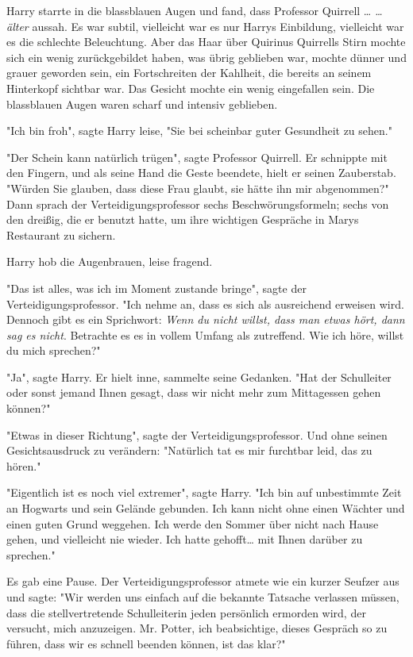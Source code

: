 {Harry starrte in die blassblauen Augen und fand, dass Professor Quirrell … \emph{… älter} aussah. Es war subtil, vielleicht war es nur Harrys Einbildung, vielleicht war es die schlechte Beleuchtung. Aber das Haar über Quirinus Quirrells Stirn mochte sich ein wenig zurückgebildet haben, was übrig geblieben war, mochte dünner und grauer geworden sein, ein Fortschreiten der Kahlheit, die bereits an seinem Hinterkopf sichtbar war. Das Gesicht mochte ein wenig eingefallen sein. Die blassblauen Augen waren scharf und intensiv geblieben.

"Ich bin froh", sagte Harry leise, "Sie bei scheinbar guter Gesundheit zu sehen."

"Der Schein kann natürlich trügen", sagte Professor Quirrell. Er schnippte mit den Fingern, und als seine Hand die Geste beendete, hielt er seinen Zauberstab. "Würden Sie glauben, dass diese Frau glaubt, sie hätte ihn mir abgenommen?" Dann sprach der Verteidigungsprofessor sechs Beschwörungsformeln; sechs von den dreißig, die er benutzt hatte, um ihre wichtigen Gespräche in Marys Restaurant zu sichern.

Harry hob die Augenbrauen, leise fragend.

"Das ist alles, was ich im Moment zustande bringe", sagte der Verteidigungsprofessor. "Ich nehme an, dass es sich als ausreichend erweisen wird. Dennoch gibt es ein Sprichwort: \emph{Wenn du nicht willst, dass man etwas hört, dann sag es nicht}. Betrachte es es in vollem Umfang als zutreffend. Wie ich höre, willst du mich sprechen?"

"Ja", sagte Harry. Er hielt inne, sammelte seine Gedanken. "Hat der Schulleiter oder sonst jemand Ihnen gesagt, dass wir nicht mehr zum Mittagessen gehen können?"

"Etwas in dieser Richtung", sagte der Verteidigungsprofessor. Und ohne seinen Gesichtsausdruck zu verändern: "Natürlich tat es mir furchtbar leid, das zu hören."

"Eigentlich ist es noch viel extremer", sagte Harry. "Ich bin auf unbestimmte Zeit an Hogwarts und sein Gelände gebunden. Ich kann nicht ohne einen Wächter und einen guten Grund weggehen. Ich werde den Sommer über nicht nach Hause gehen, und vielleicht nie wieder. Ich hatte gehofft… mit Ihnen darüber zu sprechen."

Es gab eine Pause. Der Verteidigungsprofessor atmete wie ein kurzer Seufzer aus und sagte: "Wir werden uns einfach auf die bekannte Tatsache verlassen müssen, dass die stellvertretende Schulleiterin jeden persönlich ermorden wird, der versucht, mich anzuzeigen. Mr. Potter, ich beabsichtige, dieses Gespräch so zu führen, dass wir es schnell beenden können, ist das klar?"

}
